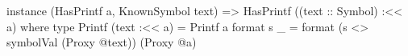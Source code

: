 \begin{code}
instance (HasPrintf a, KnownSymbol text)
    => HasPrintf ((text :: Symbol) :<< a) where
  type Printf (text :<< a) = Printf a
  format s _ = format (s <> symbolVal (Proxy @text))
                      (Proxy @a)
\end{code}
